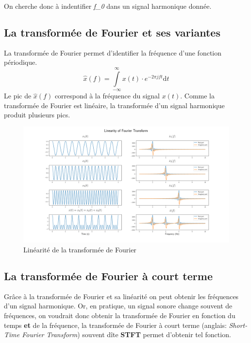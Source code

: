 \documentclass[]{article}
\begin{document}
On cherche donc à indentifier \emph{f\_0} dans un signal harmonique
donnée.

\hypertarget{la-transformee-de-fourier-et-ses-variantes}{%
\subsection{La transformée de Fourier et ses
variantes}\label{la-transformee-de-fourier-et-ses-variantes}}

La transformée de Fourier permet d'identifier la fréquence d'une
fonction périodique.
\[\hat{x}(f) = \int\limits_{-\infty}^{\infty} x(t)\cdot e^{-2\pi j ft}\mathrm{d}t\]
Le pic de \(\hat{x}(f)\) correspond à la fréquence du signal \(x(t)\).
Comme la transformée de Fourier est linéaire, la transformée d'un signal
harmonique produit plusieurs pics.

\begin{figure}
\centering
\includegraphics{plot/fourier_linearity.png}
\caption{Linéarité de la transformée de Fourier}
\end{figure}

\hypertarget{la-transformee-de-fourier-a-court-terme}{%
\subsection{La transformée de Fourier à court
terme}\label{la-transformee-de-fourier-a-court-terme}}

Grâce à la transformée de Fourier et sa linéarité on peut obtenir les
fréquences d'un signal harmonique. Or, en pratique, un signal sonore
change souvent de fréquences, on voudrait donc obtenir la transformée de
Fourier en fonction du temps \textbf{et} de la fréquence, la transformée
de Fourier à court terme (anglais: \emph{Short-Time Fourier Transform})
souvent dîte \textbf{STFT} permet d'obtenir tel fonction.
\end{document}
